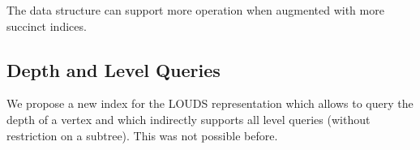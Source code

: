 \begin{algorithm}
\begin{algorithmic}
	\State {} 
\EndFunction
\end{algorithmic}
\end{algorithm}

\begin{algorithm}
\begin{algorithmic}
	\State {} 
\EndFunction
\end{algorithmic}
\end{algorithm}

\begin{algorithm}
\begin{algorithmic}
	\State {} 
\EndFunction
\end{algorithmic}
\end{algorithm}

\begin{algorithm}
\begin{algorithmic}
	\State {}
\EndFunction
\end{algorithmic}
\end{algorithm}

\begin{algorithm}
\begin{algorithmic}
 
	\State {}
\EndFunction
\end{algorithmic}
\end{algorithm}

\bigbreak

The data structure can support more operation when augmented with more succinct indices.

\subsection{Depth and Level Queries}

We propose a new index for the LOUDS representation which allows to query the depth of a vertex and which indirectly supports all level queries (without restriction on a subtree).
This was not possible before.

